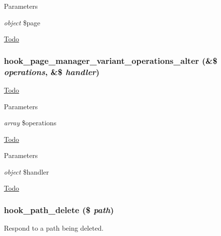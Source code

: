 \begin{DoxyParams}{Parameters}
\item[{\em object}]\$page \end{DoxyParams}
\begin{Desc}
\item[\hyperlink{todo__todo000039}{Todo}]\end{Desc}
\hypertarget{group__hooks_gaf5d4ce054cae22b3bdca52011c6e8fbc}{
\subsubsection[{hook\_\-page\_\-manager\_\-variant\_\-operations\_\-alter}]{\setlength{\rightskip}{0pt plus 5cm}hook\_\-page\_\-manager\_\-variant\_\-operations\_\-alter (\&\$ {\em operations}, \/  \&\$ {\em handler})}}
\label{group__hooks_gaf5d4ce054cae22b3bdca52011c6e8fbc}
\begin{Desc}
\item[\hyperlink{todo__todo000040}{Todo}]\end{Desc}

\begin{DoxyParams}{Parameters}
\item[{\em array}]\$operations \end{DoxyParams}
\begin{Desc}
\item[\hyperlink{todo__todo000041}{Todo}]\end{Desc}

\begin{DoxyParams}{Parameters}
\item[{\em object}]\$handler \end{DoxyParams}
\begin{Desc}
\item[\hyperlink{todo__todo000042}{Todo}]\end{Desc}
\hypertarget{group__hooks_ga1d7d28de5542f0a6364604ae0b122b7f}{
\subsubsection[{hook\_\-path\_\-delete}]{\setlength{\rightskip}{0pt plus 5cm}hook\_\-path\_\-delete (\$ {\em path})}}
\label{group__hooks_ga1d7d28de5542f0a6364604ae0b122b7f}
Respond to a path being deleted.


